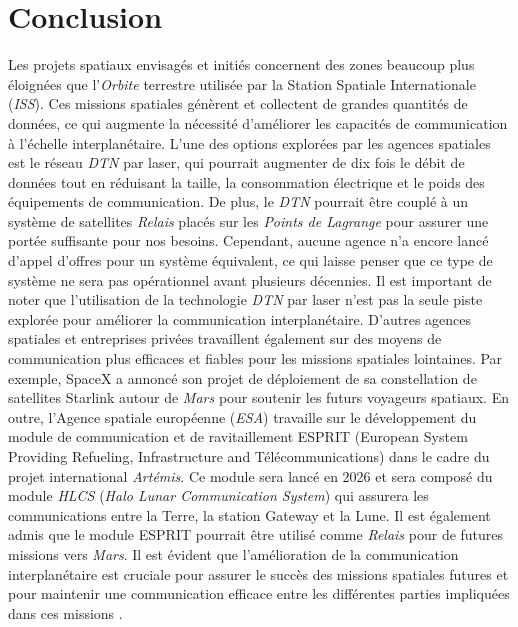 \documentclass[conference]{IEEEtran}
\begin{document}
\section{Conclusion}
\label{sec:CONC}
Les projets spatiaux envisagés et initiés concernent des zones beaucoup plus éloignées que l'\emph{Orbite} terrestre utilisée par la Station Spatiale Internationale (\emph{ISS}). Ces missions spatiales génèrent et collectent de grandes quantités de données, ce qui augmente la nécessité d'améliorer les capacités de communication à l’échelle interplanétaire.
L'une des options explorées par les agences spatiales est le réseau \emph{DTN} par laser, qui pourrait augmenter de dix fois le débit de données tout en réduisant la taille, la consommation électrique et le poids des équipements de communication. 
De plus, le \emph{DTN} pourrait être couplé à un système de satellites \emph{Relais} placés sur les \emph{Points de Lagrange} pour assurer une portée suffisante pour nos besoins. Cependant, aucune agence n'a encore lancé d'appel d'offres pour un système équivalent, ce qui laisse penser que ce type de système ne sera pas opérationnel avant plusieurs décennies.
Il est important de noter que l'utilisation de la technologie \emph{DTN} par laser n'est pas la seule piste explorée pour améliorer la communication interplanétaire. D'autres agences spatiales et entreprises privées travaillent également sur des moyens de communication plus efficaces et fiables pour les missions spatiales lointaines. Par exemple, SpaceX a annoncé son projet de déploiement de sa constellation de satellites Starlink autour de \emph{Mars} pour soutenir les futurs voyageurs spatiaux. En outre, l'Agence spatiale européenne (\emph{ESA}) travaille sur le développement du module de communication et de ravitaillement ESPRIT (European System Providing Refueling, Infrastructure and Télécommunications) dans le cadre du projet international \emph{Artémis}. Ce module sera lancé en 2026 et sera composé du module \emph{HLCS} (\emph{Halo Lunar Communication System}) qui assurera les communications entre la Terre, la station Gateway et la Lune. Il est également admis que le module ESPRIT pourrait être utilisé comme \emph{Relais} pour de futures missions vers \emph{Mars}.
Il est évident que l'amélioration de la communication interplanétaire est cruciale pour assurer le succès des missions spatiales futures et pour maintenir une communication efficace entre les différentes parties impliquées dans ces missions \cite{b17}.

\clearpage
\end{document}
